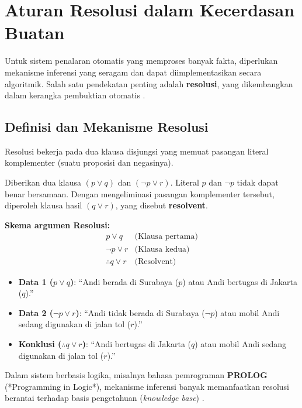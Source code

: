 \section{Aturan Resolusi dalam Kecerdasan Buatan}

Untuk sistem penalaran otomatis yang memproses banyak fakta, diperlukan mekanisme inferensi yang seragam dan dapat diimplementasikan secara algoritmik. Salah satu pendekatan penting adalah \textbf{resolusi}, yang dikembangkan dalam kerangka pembuktian otomatis \cite{rosen2019,iep_natded}.

\subsection{Definisi dan Mekanisme Resolusi}

Resolusi bekerja pada dua klausa disjungsi yang memuat pasangan literal komplementer (suatu proposisi dan negasinya).

\begin{teorema}
Diberikan dua klausa $(p \vee q)$ dan $(\neg p \vee r)$. Literal $p$ dan $\neg p$ tidak dapat benar bersamaan. Dengan mengeliminasi pasangan komplementer tersebut, diperoleh klausa hasil $(q \vee r)$, yang disebut \textbf{resolvent}.
\end{teorema}

\textbf{Skema argumen Resolusi:}
\[
\begin{array}{cl}
p \vee q & \text{(Klausa pertama)} \\
\neg p \vee r & \text{(Klausa kedua)} \\
\hline
\therefore q \vee r & \text{(Resolvent)}
\end{array}
\]

\begin{contoh}
\begin{itemize}
    \item \textbf{Data 1 ($p \vee q$)}: ``Andi berada di Surabaya ($p$) atau Andi bertugas di Jakarta ($q$).''
    \item \textbf{Data 2 ($\neg p \vee r$)}: ``Andi tidak berada di Surabaya ($\neg p$) atau mobil Andi sedang digunakan di jalan tol ($r$).''
    \item \textbf{Konklusi ($\therefore q \vee r$)}: ``Andi bertugas di Jakarta ($q$) atau mobil Andi sedang digunakan di jalan tol ($r$).''
\end{itemize}
\end{contoh}

Dalam sistem berbasis logika, misalnya bahasa pemrograman \textbf{PROLOG} (*Programming in Logic*), mekanisme inferensi banyak memanfaatkan resolusi berantai terhadap basis pengetahuan (\textit{knowledge base}) \cite{wiki_first_order_logic,libretexts_proofs}.
